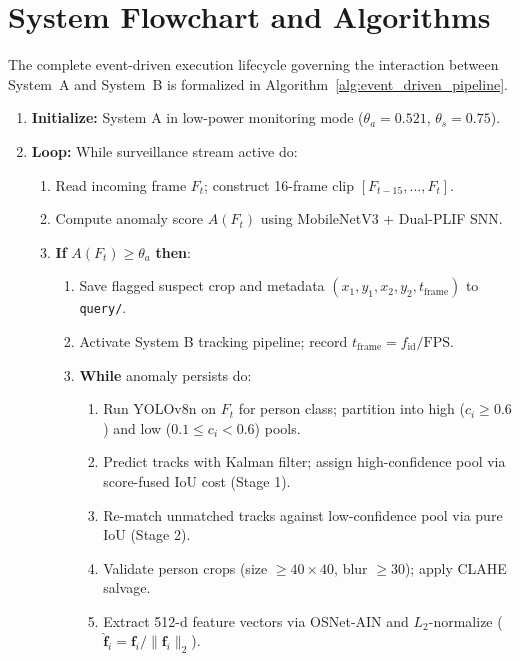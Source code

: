 \documentclass[12pt,a4paper]{report}
\begin{document}
\section{System Flowchart and Algorithms}
The complete event-driven execution lifecycle governing the interaction between System~A and System~B is formalized in Algorithm~\ref{alg:event_driven_pipeline}.

\begin{tcolorbox}[colback=white,colframe=lavenderDark,title={\textbf{Algorithm 1: Event-Driven Surveillance Pipeline}},fonttitle=\bfseries]
\label{alg:event_driven_pipeline}
\begin{small}
\begin{enumerate}
    \item \textbf{Initialize:} System A in low-power monitoring mode ($\theta_a = 0.521$, $\theta_s = 0.75$).
    \item \textbf{Loop:} While surveillance stream active do:
    \begin{enumerate}
        \item Read incoming frame $F_t$; construct 16-frame clip $[F_{t-15}, \dots, F_t]$.
        \item Compute anomaly score $A(F_t)$ using MobileNetV3 + Dual-PLIF SNN.
        \item \textbf{If} $A(F_t) \ge \theta_a$ \textbf{then}:
        \begin{enumerate}
            \item Save flagged suspect crop and metadata $(x_1, y_1, x_2, y_2, t_{\text{frame}})$ to \texttt{query/}.
            \item Activate System B tracking pipeline; record $t_{\text{frame}} = f_{\text{id}} / \text{FPS}$.
            \item \textbf{While} anomaly persists do:
            \begin{enumerate}
                \item Run YOLOv8n on $F_t$ for person class; partition into high ($c_i \ge 0.6$) and low ($0.1 \le c_i < 0.6$) pools.
                \item Predict tracks with Kalman filter; assign high-confidence pool via score-fused IoU cost (Stage 1).
                \item Re-match unmatched tracks against low-confidence pool via pure IoU (Stage 2).
                \item Validate person crops (size $\ge 40 \times 40$, blur $\ge 30$); apply CLAHE salvage.
                \item Extract 512-d feature vectors via OSNet-AIN and $L_2$-normalize ($\hat{\mathbf{f}}_i = \mathbf{f}_i / \|\mathbf{f}_i\|_2$).

\end{enumerate}
\end{enumerate}
\end{enumerate}
\end{enumerate}
\end{small}
\end{tcolorbox}
\end{document}
